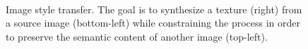 \begin{figure}[t]
\begin{center}
	\\
	\caption[Image style transfer]{Image style transfer. The goal is to synthesize a texture (right) from a source image (bottom-left) while constraining the process in order to preserve the semantic content of another image (top-left).}
	\vspace{-0.65cm}
	\label{fig:style_transfer}
\end{center}
\end{figure}